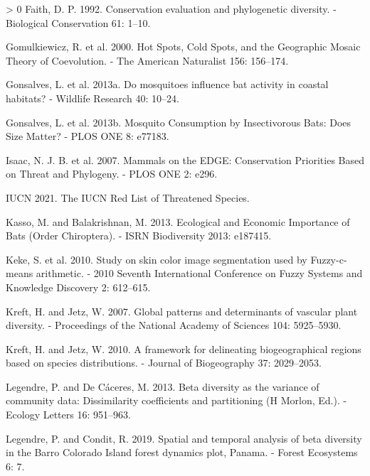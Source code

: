 \documentclass[10pt,oneside]{article}
\newlength{\cslhangindent}
\newenvironment{CSLReferences}[3] %
 {%
  \setlength{\parindent}{0pt}
  \ifodd #1 \everypar{\setlength{\hangindent}{\cslhangindent}}\ignorespaces\fi
  \ifnum #2 > 0
  \setlength{\parskip}{#2\baselineskip}
  \fi
 }%
 {}
\begin{document}
\begin{CSLReferences}{1}{0}
\leavevmode\hypertarget{ref-Faith1992ConEva}{}%
Faith, D. P. 1992. Conservation evaluation and phylogenetic diversity. -
Biological Conservation 61: 1--10.

\leavevmode\hypertarget{ref-Gomulkiewicz2000HotSpo}{}%
Gomulkiewicz, R. et al. 2000. Hot Spots, Cold Spots, and the Geographic
Mosaic Theory of Coevolution. - The American Naturalist 156: 156--174.

\leavevmode\hypertarget{ref-Gonsalves2013MosInf}{}%
Gonsalves, L. et al. 2013a. Do mosquitoes influence bat activity in
coastal habitats? - Wildlife Research 40: 10--24.

\leavevmode\hypertarget{ref-Gonsalves2013MosCon}{}%
Gonsalves, L. et al. 2013b. Mosquito Consumption by Insectivorous Bats:
Does Size Matter? - PLOS ONE 8: e77183.

\leavevmode\hypertarget{ref-Isaac2007MamEdg}{}%
Isaac, N. J. B. et al. 2007. Mammals on the EDGE: Conservation
Priorities Based on Threat and Phylogeny. - PLOS ONE 2: e296.

\leavevmode\hypertarget{ref-IUCN2021IucRed}{}%
IUCN 2021. The IUCN Red List of Threatened Species.

\leavevmode\hypertarget{ref-Kasso2013EcoEco}{}%
Kasso, M. and Balakrishnan, M. 2013. Ecological and Economic Importance
of Bats (Order Chiroptera). - ISRN Biodiversity 2013: e187415.

\leavevmode\hypertarget{ref-Keke2010StuSki}{}%
Keke, S. et al. 2010. Study on skin color image segmentation used by
Fuzzy-c-means arithmetic. - 2010 Seventh International Conference on
Fuzzy Systems and Knowledge Discovery 2: 612--615.

\leavevmode\hypertarget{ref-Kreft2007GloPat}{}%
Kreft, H. and Jetz, W. 2007. Global patterns and determinants of
vascular plant diversity. - Proceedings of the National Academy of
Sciences 104: 5925--5930.

\leavevmode\hypertarget{ref-Kreft2010FraDel}{}%
Kreft, H. and Jetz, W. 2010. A framework for delineating biogeographical
regions based on species distributions. - Journal of Biogeography 37:
2029--2053.

\leavevmode\hypertarget{ref-Legendre2013BetDiv}{}%
Legendre, P. and De Cáceres, M. 2013. Beta diversity as the variance of
community data: Dissimilarity coefficients and partitioning (H Morlon,
Ed.). - Ecology Letters 16: 951--963.

\leavevmode\hypertarget{ref-Legendre2019SpaTem}{}%
Legendre, P. and Condit, R. 2019. Spatial and temporal analysis of beta
diversity in the Barro Colorado Island forest dynamics plot, Panama. -
Forest Ecosystems 6: 7.


\end{CSLReferences}
\end{document}
